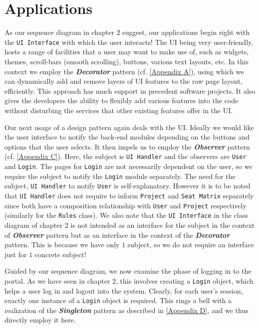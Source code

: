 \documentclass{report}
\begin{document}
\section{Applications}
As our sequence diagram in chapter $2$ suggest, our applications begin right with the \texttt{UI Interface} with which the user interacts! The UI being very user-friendly, hosts a range of facilities that a user may want to make use of, such as widgets, themes, scroll-bars (smooth scrolling), buttons, various text layouts, etc. In this context we employ the \textit{\textbf{Decorator}} pattern (cf. \ref{Appendix A}), using which we can dynamically add and remove layers of UI features to the raw page layout, efficiently. This approach has much support in precedent software projects. 
It also gives the developers the ability to flexibly add various features into the code without disturbing the services that other existing features offer in the UI. 

Our next usage of a design pattern again deals with the UI. Ideally we would like the user interface to notify the back-end modules depending on the buttons and options that the user selects. It then impels us to employ the \textit{\textbf{Observer}} pattern (cf. \ref{Appendix C}). Here, the subject is \texttt{UI Handler} and the observers are \texttt{User} and \texttt{Login}. The pages for \texttt{Login} are not necessarily dependent on the user, so we require the subject to notify the \texttt{Login} module separately. The need for the subject, \texttt{UI Handler} to notify \texttt{User} is self-explanatory. However it is to be noted that \texttt{UI Handler} does not require to inform \texttt{Project} and \texttt{Seat Matrix} separately since both have a composition relationship with \texttt{User} and \texttt{Project} respectively (similarly for the \texttt{Rules} class).
We also note that the \texttt{UI Interface} in the class diagram of chapter $2$ is not intended as an interface for the subject in the context of \textit{\textbf{Observer}} pattern but as an interface in the context of the \textit{\textbf{Decorator}} pattern. This is because we have only $1$ subject, so we do not require an interface just for $1$ concrete subject!

Guided by our sequence diagram, we now examine the phase of logging in to the portal. As we have seen in chapter $2$, this involves creating a \texttt{Login} object, which helps a user log in and logout into the system. Clearly, for each user's session, exactly one instance of a \texttt{Login} object is required. This rings a bell with a realization of the \textit{\textbf{Singleton}} pattern as described in \ref{Appendix D}, and we thus directly employ it here.
\end{document}
